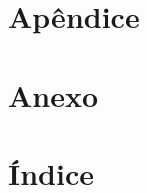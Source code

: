 \documentclass[12pt, a4paper, twoside]{article}
\numberwithin{equation}{subsection}
\begin{document}
\section*{Apêndice}


\section{Anexo}

\newpage

\section{Índice}

\newpage

\end{document}
